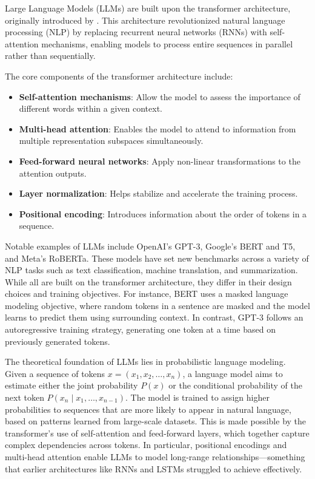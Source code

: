 Large Language Models (LLMs) are built upon the transformer architecture, originally introduced by \cite{vaswani2023attentionneed}. This architecture revolutionized natural language processing (NLP) by replacing recurrent neural networks (RNNs) with self-attention mechanisms, enabling models to process entire sequences in parallel rather than sequentially.

The core components of the transformer architecture include:
\begin{itemize}
    \item \textbf{Self-attention mechanisms}: Allow the model to assess the importance of different words within a given context.
    \item \textbf{Multi-head attention}: Enables the model to attend to information from multiple representation subspaces simultaneously.
    \item \textbf{Feed-forward neural networks}: Apply non-linear transformations to the attention outputs.
    \item \textbf{Layer normalization}: Helps stabilize and accelerate the training process.
    \item \textbf{Positional encoding}: Introduces information about the order of tokens in a sequence.
\end{itemize}

Notable examples of LLMs include OpenAI's GPT-3, Google’s BERT and T5, and Meta’s RoBERTa. These models have set new benchmarks across a variety of NLP tasks such as text classification, machine translation, and summarization. While all are built on the transformer architecture, they differ in their design choices and training objectives. For instance, BERT uses a masked language modeling objective, where random tokens in a sentence are masked and the model learns to predict them using surrounding context. In contrast, GPT-3 follows an autoregressive training strategy, generating one token at a time based on previously generated tokens.

The theoretical foundation of LLMs lies in probabilistic language modeling. Given a sequence of tokens \( x = (x_1, x_2, \dots, x_n) \), a language model aims to estimate either the joint probability \( P(x) \) or the conditional probability of the next token \( P(x_n \mid x_1, \dots, x_{n-1}) \). The model is trained to assign higher probabilities to sequences that are more likely to appear in natural language, based on patterns learned from large-scale datasets. This is made possible by the transformer’s use of self-attention and feed-forward layers, which together capture complex dependencies across tokens. In particular, positional encodings and multi-head attention enable LLMs to model long-range relationships—something that earlier architectures like RNNs and LSTMs struggled to achieve effectively.



